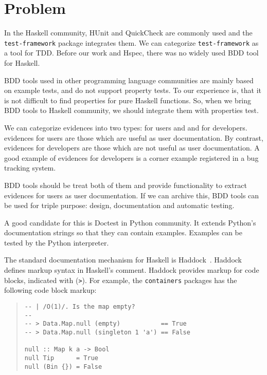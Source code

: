 \documentclass[preprint]{sigplanconf}
\begin{document}

\section{Problem}

In the Haskell community, HUnit and QuickCheck are commonly used %
and the {\tt test-framework} package integrates them.
We can categorize {\tt test-framework} as
a tool for TDD.
Before our work and Hspec, there was no widely used BDD tool for Haskell.

BDD tools used in other programming language communities are
mainly based on example tests,
and do not support property tests.
To our experience is, that it is not difficult to find properties for
pure Haskell functions.
So, when we bring BDD tools to
Haskell community, we should integrate them with properties test.

We can categorize evidences into two types: for users and
and for developers.
evidences for users are those which are useful as user documentation.
By contrast, evidences for developers are
those which are not useful as user documentation.
A good example of evidences for developers
is a corner example registered in a bug tracking system.

BDD tools should be treat both of them and provide functionality
to extract evidences for users as user documentation.
If we can archive this, BDD tools can be used for
triple purpose: design, documentation and automatic testing.

A good candidate for this is Doctest in Python community.
It extends Python's documentation strings so that they
can contain examples.
Examples can be tested by the Python interpreter.

The standard documentation mechanism for Haskell is
Haddock~\cite{haddock}.
Haddock defines markup syntax in Haskell's comment.
Haddock provides markup for code blocks, indicated with ({\tt >}).
For example, the {\tt containers} packages has the following code block markup:

\begin{quote}
\small
\begin{verbatim}
-- | /O(1)/. Is the map empty?
--
-- > Data.Map.null (empty)           == True
-- > Data.Map.null (singleton 1 'a') == False

null :: Map k a -> Bool
null Tip      = True
null (Bin {}) = False
\end{verbatim}
\end{quote}
\end{document}
